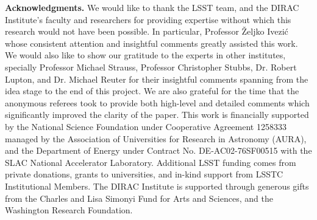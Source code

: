\documentclass[12pt]{aastex62}
\theoremstyle{definition}
\begin{document}
\textbf{Acknowledgments.} We would like to thank the LSST team, and the DIRAC Institute's faculty and researchers for providing expertise without which this research would not have been possible. In particular, Professor \v{Z}eljko Ivezi\'{c} whose consistent attention and insightful comments greatly assisted this work. We would also like to show our gratitude to the experts in other institutes, specially Professor Michael Strauss, Professor Christopher Stubbs, Dr. Robert Lupton, and Dr. Michael Reuter for their insightful comments spanning from the idea stage to the end of this project. We are also grateful for the time that the anonymous referees took to provide both high-level and detailed comments which significantly improved the clarity of the paper. This work is financially supported by the National Science Foundation under Cooperative Agreement 1258333 managed by the Association of Universities for Research in Astronomy (AURA), and the Department of Energy under Contract No. DE-AC02-76SF00515 with the SLAC National Accelerator Laboratory. Additional LSST funding comes from private donations, grants to universities, and in-kind support from LSSTC Institutional Members. The DIRAC Institute is supported through generous gifts from the Charles and Lisa Simonyi Fund for Arts and Sciences, and the Washington Research Foundation.



%
%

\end{document}
